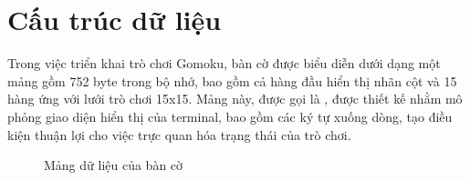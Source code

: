 \section{Cấu trúc dữ liệu}
Trong việc triển khai trò chơi Gomoku, bàn cờ được biểu diễn dưới dạng một mảng gồm 752 byte trong bộ nhớ, bao gồm cả hàng đầu hiển thị nhãn cột và 15 hàng ứng với lưới trò chơi 15x15. Mảng này, được gọi là , được thiết kế nhằm mô phỏng giao diện hiển thị của terminal, bao gồm các ký tự xuống dòng, tạo điều kiện thuận lợi cho việc trực quan hóa trạng thái của trò chơi.


\begin{figure}[!htbp]
    \centering
    \ttfamily
    \textvisiblespace\textvisiblespace\textvisiblespace{}\textvisiblespace
    \caption{Mảng dữ liệu của bàn cờ}
\end{figure}